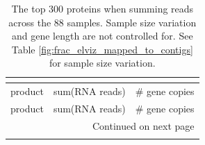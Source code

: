 \begin{singlespace}
\begin{longtable}{p{} cc}
\caption[Highest expressed proteins, across samples]{
	The top 300 proteins when summing reads across the 88 samples.
    Sample size variation and gene length are not controlled for.
    See Table \ref{fig:frac_elviz_mapped_to_contigs} for sample size variation.} \\  %
\label{table:top_genes} \\  %
\toprule
                                           product & sum(RNA reads) & \# gene copies \\
\midrule \endfirsthead
\toprule
                                           product & sum(RNA reads) & \# gene copies \\
\midrule

\endhead
\midrule
\multicolumn{3}{r}{{Continued on next page}} \\
\midrule
\endfoot


\end{longtable}
\end{singlespace}
